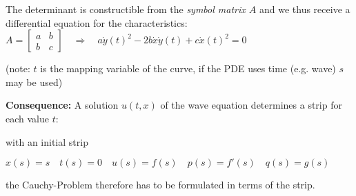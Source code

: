 The determinant is constructible from the \emph{symbol matrix $A$} and we thus receive a differential equation for the characteristics:
\colorbox{shadecolor}{$
    \displaystyle
    A = \begin{bmatrix}
        a & b \\
        b & c
    \end{bmatrix}
    \quad\Rightarrow\quad
    a\dot{y}(t)^2 - 2b\dot{x}\dot{y}(t) + c\dot{x}(t)^2 = 0
$}

(note: $t$ is the mapping variable of the curve, if the PDE uses time (e.g. wave) $s$ may be used)

\textbf{Consequence:} A solution $u(t,x)$ of the wave equation determines a strip for each value $t$:

with an initial strip

$x(s) = s\quad t(s) = 0\quad u(s) = f(s)\quad p(s) = f'(s)\quad q(s)=g(s)$

the Cauchy-Problem therefore has to be formulated in terms of the strip.